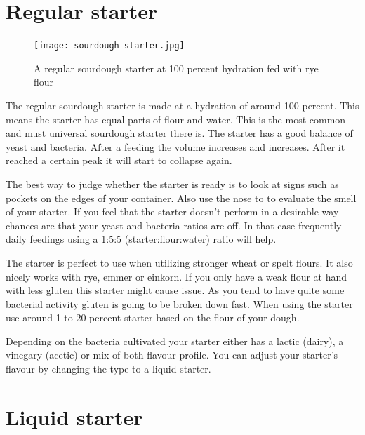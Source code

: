 \section{Regular starter}

\begin{figure}[!htb]
  \texttt{[image: sourdough-starter.jpg]}
  \caption{A regular sourdough starter at 100 percent hydration fed with rye flour}
  \label{fig:regular-sourdough-starter}
\end{figure}

The regular sourdough starter is made at a hydration of around 100 percent.
This means the starter has equal parts of flour and water. This is the most
common and must universal sourdough starter there is. The starter has a good
balance of yeast and bacteria. After a feeding the volume increases and
increases. After it reached a certain peak it will start to collapse again.

The best way to judge whether the starter is ready is to look at signs such as
pockets on the edges of your container. Also use the nose to to evaluate the
smell of your starter. If you feel that the starter doesn't perform in a
desirable way chances are that your yeast and bacteria ratios are off. In that
case frequently daily feedings using a 1:5:5 (starter:flour:water) ratio will
help.

The starter is perfect to use when utilizing stronger wheat or spelt flours.
It also nicely works with rye, emmer or einkorn. If you only have a weak flour
at hand with less gluten this starter might cause issue. As you tend to have
quite some bacterial activity gluten is going to be broken down fast. When
using the starter use around 1 to 20 percent starter based on the flour of your
dough.

Depending on the bacteria cultivated your starter either has a lactic (dairy),
a vinegary (acetic) or mix of both flavour profile. You can adjust your
starter's flavour by changing the type to a liquid starter.

\section{Liquid starter}

